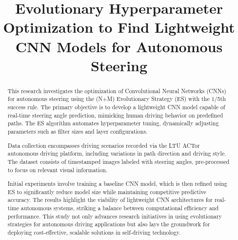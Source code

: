 \documentclass[conference]{IEEEtran}
\begin{document}
\title{Evolutionary Hyperparameter Optimization to Find Lightweight CNN Models for Autonomous Steering}

\author{
\and
{}
\and
{}
}

\maketitle

\begin{abstract}
    This research investigates the optimization of Convolutional Neural Networks (CNNs) for autonomous steering using the (N+M) Evolutionary Strategy (ES) with the 1/5th success rule. The primary objective is to develop a lightweight CNN model capable of real-time steering angle prediction, mimicking human driving behavior on predefined paths. The ES algorithm automates hyperparameter tuning, dynamically adjusting parameters such as filter sizes and layer configurations.
    
    Data collection encompasses driving scenarios recorded via the LTU ACTor autonomous driving platform, including variations in path direction and driving style. The dataset consists of timestamped images labeled with steering angles, pre-processed to focus on relevant visual information.
    
    Initial experiments involve training a baseline CNN model, which is then refined using ES to significantly reduce model size while maintaining competitive predictive accuracy. The results highlight the viability of lightweight CNN architectures for real-time autonomous systems, striking a balance between computational efficiency and performance. This study not only advances research initiatives in using evolutionary strategies for autonomous driving applications but also lays the groundwork for deploying cost-effective, scalable solutions in self-driving technology.
\end{abstract}
\end{document}
